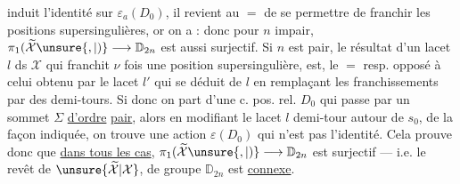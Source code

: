 induit l'identité sur $\varepsilon_a(D_0)$, il revient au
$=$ de se permettre de franchir les
positions supersingulières, or on a :
donc pour $n$ impair, $\pi_1(\widetilde{\mathcal X}\unsure{,|)}\longrightarrow\mathbb D_{2n}$
est aussi surjectif. Si $n$ est
pair, le résultat  d'un lacet $l$
 ds $\mathcal X$ qui franchit
$\nu$ fois une position supersingulière,
est,  le $=$ resp. opposé à celui obtenu
par le lacet $l'$ qui se déduit de
$l$ en remplaçant les franchissements
par des demi-tours. Si donc on
 part d'une c. pos. rel. $D_0$ qui
passe par un sommet  $\Sigma$ \uline{d'ordre}
\uline{pair}, alors en modifiant le lacet $l$
demi-tour  autour de $s_0$, de la
façon indiquée, on trouve une
 action  $\varepsilon(D_0)$ qui n'est
pas l'identité. Cela prouve donc que
\uline{dans tous les cas}, $\pi_1(\widetilde{\mathcal X}\unsure{,|)}\longrightarrow\mathbb D_{2n}$ est
surjectif --- i.e. le revêt  de $\unsure{\widetilde{\mathcal X}|\mathcal X}$, de groupe
$\mathbb D_{2n}$ est \uline{connexe}.

